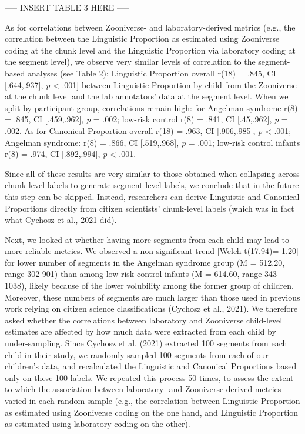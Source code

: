 \documentclass[english,,man]{apa6}
\begin{document}
----- INSERT TABLE 3 HERE -----

As for correlations between Zooniverse- and laboratory-derived metrics (e.g., the correlation between the Linguistic Proportion as estimated using Zooniverse coding at the chunk level and the Linguistic Proportion via laboratory coding at the segment level), we observe very similar levels of correlation to the segment-based analyses (see Table 2): Linguistic Proportion overall r(18) = .845, CI {[}.644,.937{]}, \emph{p} \textless{} .001{]} between Linguistic Proportion by child from the Zooniverse at the chunk level and the lab annotators' data at the segment level. When we split by participant group, correlations remain high: for Angelman syndrome r(8) = .845, CI {[}.459,.962{]}, \emph{p} = .002; low-risk control r(8) = .841, CI {[}.45,.962{]}, \emph{p} = .002. As for Canonical Proportion overall r(18) = .963, CI {[}.906,.985{]}, \emph{p} \textless{} .001; Angelman syndrome: r(8) = .866, CI {[}.519,.968{]}, \emph{p} = .001; low-risk control infants r(8) = .974, CI {[}.892,.994{]}, \emph{p} \textless{} .001.

Since all of these results are very similar to those obtained when collapsing across chunk-level labels to generate segment-level labels, we conclude that in the future this step can be skipped. Instead, researchers can derive Linguistic and Canonical Proportions directly from citizen scientists' chunk-level labels (which was in fact what Cychosz et al., 2021 did).

Next, we looked at whether having more segments from each child may lead to more reliable metrics. We observed a non-significant trend {[}Welch t(17.94)=-1.20{]} for lower number of segments in the Angelman syndrome group (M = 512.20, range 302-901) than among low-risk control infants (M = 614.60, range 343-1038), likely because of the lower volubility among the former group of children. Moreover, these numbers of segments are much larger than those used in previous work relying on citizen science classifications (Cychosz et al., 2021). We therefore asked whether the correlations between laboratory and Zooniverse child-level estimates are affected by how much data were extracted from each child by under-sampling. Since Cychosz et al. (2021) extracted 100 segments from each child in their study, we randomly sampled 100 segments from each of our children's data, and recalculated the Linguistic and Canonical Proportions based only on these 100 labels. We repeated this process 50 times, to assess the extent to which the association between laboratory- and Zooniverse-derived metrics varied in each random sample (e.g., the correlation between Linguistic Proportion as estimated using Zooniverse coding on the one hand, and Linguistic Proportion as estimated using laboratory coding on the other).
\end{document}
